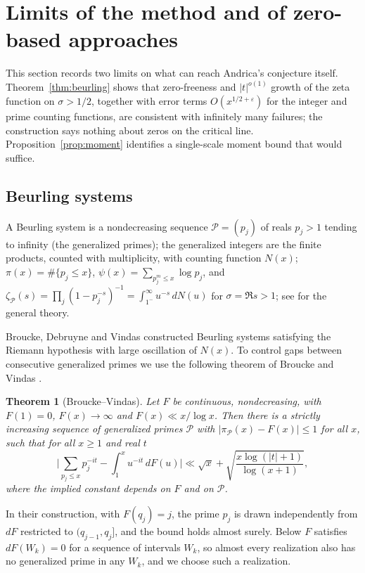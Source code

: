\documentclass[11pt]{amsart}
\newtheorem{theorem}{Theorem}[section]
\theoremstyle{definition}
\theoremstyle{remark}
\begin{document}
\section{Limits of the method and of zero-based approaches}\label{sec:limits}

This section records two limits on what can reach Andrica's conjecture itself. Theorem~\ref{thm:beurling} shows that zero-freeness and $|t|^{o(1)}$ growth of the zeta function on $\sigma>1/2$, together with error terms $O(x^{1/2+\varepsilon})$ for the integer and prime counting functions, are consistent with infinitely many failures; the construction says nothing about zeros on the critical line. Proposition~\ref{prop:moment} identifies a single-scale moment bound that would suffice.

\subsection{Beurling systems}
A Beurling system is a nondecreasing sequence $\mathcal P=(p_j)$ of reals $p_j>1$ tending to infinity (the generalized primes); the generalized integers are the finite products, counted with multiplicity, with counting function $N(x)$; $\pi(x)=\#\{p_j\le x\}$, $\psi(x)=\sum_{p_j^m\le x}\log p_j$, and $\zeta_{\mathcal P}(s)=\prod_j(1-p_j^{-s})^{-1}=\int_{1^-}^\infty u^{-s}\,dN(u)$ for $\sigma=\Re s>1$; see \cite{DZ} for the general theory.

Broucke, Debruyne and Vindas \cite{BDV} constructed Beurling systems satisfying the Riemann hypothesis with large oscillation of $N(x)$. To control gaps between consecutive generalized primes we use the following theorem of Broucke and Vindas \cite[Theorem~1.2]{BV}.

\begin{theorem}[Broucke--Vindas]\label{thm:BVb}
Let $F$ be continuous, nondecreasing, with $F(1)=0$, $F(x)\to\infty$ and $F(x)\ll x/\log x$. Then there is a strictly increasing sequence of generalized primes $\mathcal P$ with $|\pi_{\mathcal P}(x)-F(x)|\le1$ for all $x$, such that for all $x\ge1$ and real $t$
\[
\Big|\sum_{p_j\le x}p_j^{-it}-\int_1^x u^{-it}\,dF(u)\Big|\ll \sqrt x+\sqrt{\frac{x\log(|t|+1)}{\log(x+1)}} ,
\]
where the implied constant depends on $F$ and on $\mathcal P$.
\end{theorem}

In their construction, with $F(q_j)=j$, the prime $p_j$ is drawn independently from $dF$ restricted to $(q_{j-1},q_j]$, and the bound holds almost surely. Below $F$ satisfies $dF(W_k)=0$ for a sequence of intervals $W_k$, so almost every realization also has no generalized prime in any $W_k$, and we choose such a realization.
\end{document}
